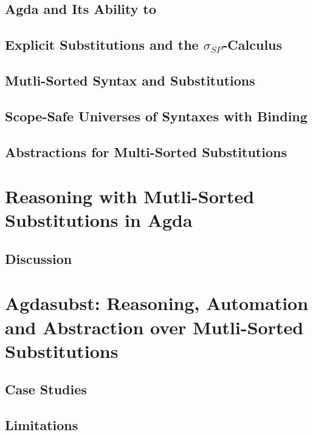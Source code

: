 \documentclass[screen,nonacm]{acmart}
\begin{document}
\subsection{Agda and Its Ability to } 

\subsection{Explicit Substitutions and the $\sigma_{SP}$-Calculus}

\subsection{Mutli-Sorted Syntax and Substitutions}

\subsection*{Scope-Safe Universes of Syntaxes with Binding}

\subsection*{Abstractions for Multi-Sorted Substitutions}

\section{Reasoning with Mutli-Sorted Substitutions in Agda}\label{sec:multi}

\subsection{Discussion}\label{sec:discussion-1}

\section{Agdasubst: Reasoning, Automation and Abstraction over Mutli-Sorted Substitutions}\label{sec:agdasubst}

\subsection{Case Studies}

\subsection{Limitations}\label{sec:limitations}
\end{document}
